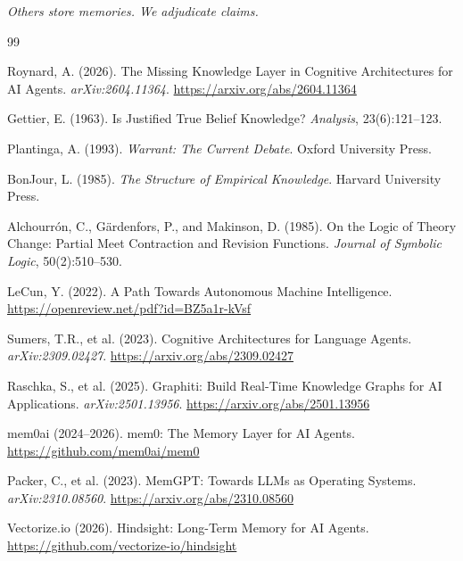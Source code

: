 \documentclass[11pt,letterpaper]{article}
\begin{document}
\begin{center}
\textit{Others store memories. We adjudicate claims.}
\end{center}


\begin{thebibliography}{99}

Roynard, A. (2026).
\newblock The Missing Knowledge Layer in Cognitive Architectures for AI Agents.
\newblock \textit{arXiv:2604.11364}. \url{https://arxiv.org/abs/2604.11364}

Gettier, E. (1963).
\newblock Is Justified True Belief Knowledge?
\newblock \textit{Analysis}, 23(6):121--123.

Plantinga, A. (1993).
\newblock \textit{Warrant: The Current Debate}.
\newblock Oxford University Press.

BonJour, L. (1985).
\newblock \textit{The Structure of Empirical Knowledge}.
\newblock Harvard University Press.

Alchourr{\'o}n, C., G{\"a}rdenfors, P., and Makinson, D. (1985).
\newblock On the Logic of Theory Change: Partial Meet Contraction and Revision Functions.
\newblock \textit{Journal of Symbolic Logic}, 50(2):510--530.

LeCun, Y. (2022).
\newblock A Path Towards Autonomous Machine Intelligence.
\newblock \url{https://openreview.net/pdf?id=BZ5a1r-kVsf}

Sumers, T.R., et al. (2023).
\newblock Cognitive Architectures for Language Agents.
\newblock \textit{arXiv:2309.02427}. \url{https://arxiv.org/abs/2309.02427}

Raschka, S., et al. (2025).
\newblock Graphiti: Build Real-Time Knowledge Graphs for AI Applications.
\newblock \textit{arXiv:2501.13956}. \url{https://arxiv.org/abs/2501.13956}

mem0ai (2024--2026).
\newblock mem0: The Memory Layer for AI Agents.
\newblock \url{https://github.com/mem0ai/mem0}

Packer, C., et al. (2023).
\newblock MemGPT: Towards LLMs as Operating Systems.
\newblock \textit{arXiv:2310.08560}. \url{https://arxiv.org/abs/2310.08560}

Vectorize.io (2026).
\newblock Hindsight: Long-Term Memory for AI Agents.
\newblock \url{https://github.com/vectorize-io/hindsight}


\end{thebibliography}
\end{document}
